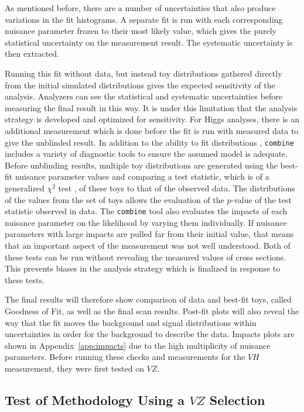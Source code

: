 %
As mentioned before, there are a number of uncertainties that
also produce variations in the fit histograms.
A separate fit is run with each corresponding nuisance parameter frozen to their most likely value,
which gives the purely statistical uncertainty on the measurement result.
The systematic uncertainty is then extracted.

Running this fit without data, but instead toy distributions gathered directly
from the initial simulated distributions gives the expected sensitivity of the analysis.
Analyzers can see the statistical and systematic uncertainties before measuring the final result in this way.
It is under this limitation that the analysis strategy is developed and optimized for sensitivity.
For Higgs analyses, there is an additional measurement which is done before the fit is run
with measured data to give the unblinded result.
In addition to the ability to fit distributions , \texttt{combine} includes a variety of
diagnostic tools to ensure the assumed model is adequate.
Before unblinding results, multiple toy distributions are generated using the best-fit
nuisance parameter values and comparing a test statistic,
which is of a generalized $\chi^2$ test \cite{cousins2013generalization},
of these toys to that of the observed data.
The distributions of the values from the set of toys allows the evaluation of the $p$-value
of the test statistic observed in data.
The \texttt{combine} tool also evaluates the impacts of each
nuisance parameter on the likelihood by varying them individually.
If nuisance parameters with large impacts are pulled far from their initial value,
that means that an important aspect of the measurement was not well understood.
Both of these tests can be run without revealing the measured values of cross sections.
This prevents biases in the analysis strategy which is finalized in response to these tests.

The final results will therefore show comparison of data and best-fit toys,
called Goodness of Fit, as well as the final scan results.
Post-fit plots will also reveal the way that the fit moves the background and signal distributions
within uncertainties in order for the background to describe the data.
Impacts plots are shown in Appendix~\ref{app:impacts} due to the high multiplicity of nuisance parameters.
Before running these checks and measurements for the $V\!H$ measurement,
they were first tested on $V\!Z$.

\subsection{Test of Methodology Using a $V\!Z$ Selection}

